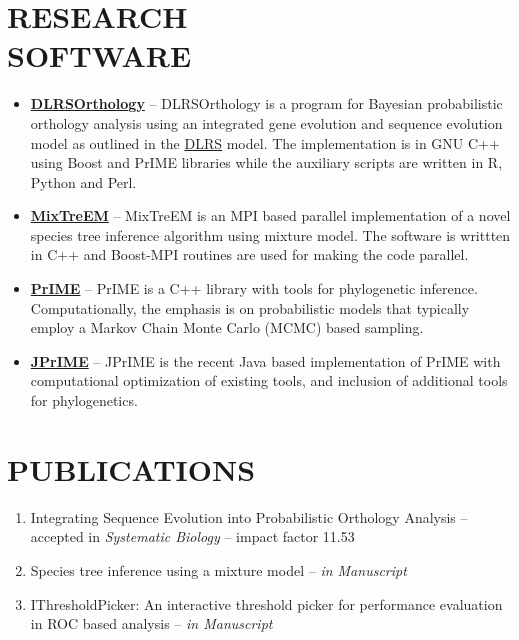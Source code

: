 \documentclass[margin, 10pt]{res} %
\begin{document}
\begin{resume}
\section{RESEARCH \\ SOFTWARE} 
\begin{itemize}
\item \textbf{\href{http://prime.scilifelab.se/dlrsorthology/}{DLRSOrthology}} -- DLRSOrthology is a program for Bayesian probabilistic orthology analysis using an integrated gene evolution and sequence evolution model as outlined in the \href{http://www.pnas.org/content/106/14/5714.long}{DLRS} model. The implementation is in GNU C++ using Boost and PrIME libraries while the auxiliary scripts are written in R, Python and Perl.
\item \textbf{\href{http://prime.scilifelab.se/mixtreem/}{MixTreEM}} -- MixTreEM is an MPI based parallel implementation of a novel species tree inference algorithm using mixture model. The software is writtten in C++ and Boost-MPI routines are used for making the code parallel.
\item \textbf{\href{http://prime.scilifelab.se/}{PrIME}} -- PrIME is a C++ library with tools for phylogenetic inference. Computationally, the emphasis is on probabilistic models that typically employ a Markov Chain Monte Carlo (MCMC) based sampling.
\item \textbf{\href{https://code.google.com/p/jprime/}{JPrIME}} -- JPrIME is the recent Java based implementation of PrIME with computational optimization of existing tools, and inclusion of additional tools for phylogenetics.
\end{itemize}


\section{PUBLICATIONS} 
\begin{enumerate}
\item Integrating Sequence Evolution into Probabilistic Orthology Analysis -- accepted in {\sl Systematic Biology} -- impact factor 11.53
\item Species tree inference using a mixture model -- {\sl in Manuscript}
\item IThresholdPicker: An interactive threshold picker for performance evaluation in ROC based analysis -- {\sl in Manuscript}
\end{enumerate}



\end{resume}
\end{document}

